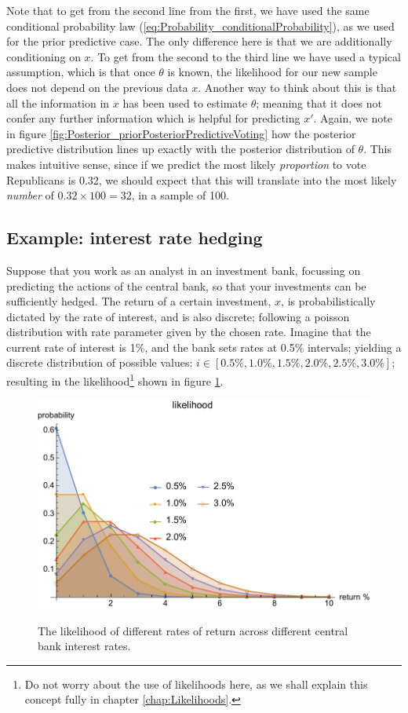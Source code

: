 \documentclass[11pt,fullpage]{book}
\begin{document}
Note that to get from the second line from the first, we have used the same conditional probability law  (\ref{eq:Probability_conditionalProbability}), as we used for the prior predictive case. The only difference here is that we are additionally conditioning on $x$. To get from the second to the third line we have used a typical assumption, which is that once $\theta$ is known, the likelihood for our new sample does not depend on the previous data $x$. Another way to think about this is that all the information in $x$ has been used to estimate $\theta$; meaning that it does not confer any further information which is helpful for predicting $x'$. Again, we note in figure \ref{fig:Posterior_priorPosteriorPredictiveVoting} how the posterior predictive distribution lines up exactly with the posterior distribution of $\theta$. This makes intuitive sense, since if we predict the most likely \textit{proportion} to vote Republicans is 0.32, we should expect that this will translate into the most likely \textit{number} of $0.32\times 100=32$, in a sample of 100.

\subsection{Example: interest rate hedging}
Suppose that you work as an analyst in an investment bank, focussing on predicting the actions of the central bank, so that your investments can be sufficiently hedged. The return of a certain investment, $x$, is probabilistically dictated by the rate of interest, and is also discrete; following a poisson distribution with rate parameter given by the chosen rate. Imagine that the current rate of interest is 1\%, and the bank sets rates at 0.5\% intervals; yielding a discrete distribution of possible values: $i\in[0.5\%, 1.0\%, 1.5\%, 2.0\%, 2.5\%,3.0\% ]$; resulting in the likelihood\footnote{Do not worry about the use of likelihoods here, as we shall explain this concept fully in chapter \ref{chap:Likelihoods}.} shown in figure \ref{fig:Posterior_likelihoodInterestRate}.

\begin{figure}
\centering
\scalebox{0.65} 
{\includegraphics{Posterior_likelihoodInterestRate.pdf}}
\caption{The likelihood of different rates of return across different central bank interest rates.}\label{fig:Posterior_likelihoodInterestRate}
\end{figure}
\end{document}
